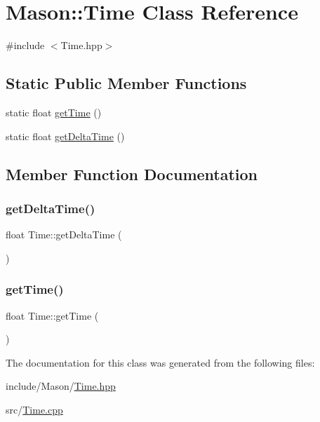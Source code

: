 \hypertarget{class_mason_1_1_time}{}\section{Mason\+:\+:Time Class Reference}
\label{class_mason_1_1_time}


{\ttfamily \#include $<$Time.\+hpp$>$}

\subsection*{Static Public Member Functions}
\begin{DoxyCompactItemize}
\item 
static float \hyperlink{class_mason_1_1_time_ad6773c7a2339b463fc7ea14e31315c89}{get\+Time} ()
\item 
static float \hyperlink{class_mason_1_1_time_a405c7642c4ba0ee719a8d0491099102a}{get\+Delta\+Time} ()
\end{DoxyCompactItemize}


\subsection{Member Function Documentation}
\hypertarget{class_mason_1_1_time_a405c7642c4ba0ee719a8d0491099102a}{}\label{class_mason_1_1_time_a405c7642c4ba0ee719a8d0491099102a} 
\subsubsection{\texorpdfstring{get\+Delta\+Time()}{getDeltaTime()}}
{\footnotesize\ttfamily float Time\+::get\+Delta\+Time (\begin{DoxyParamCaption}{ }\end{DoxyParamCaption})\hspace{0.3cm}{\ttfamily [static]}}

\hypertarget{class_mason_1_1_time_ad6773c7a2339b463fc7ea14e31315c89}{}\label{class_mason_1_1_time_ad6773c7a2339b463fc7ea14e31315c89} 
\subsubsection{\texorpdfstring{get\+Time()}{getTime()}}
{\footnotesize\ttfamily float Time\+::get\+Time (\begin{DoxyParamCaption}{ }\end{DoxyParamCaption})\hspace{0.3cm}{\ttfamily [static]}}



The documentation for this class was generated from the following files\+:\begin{DoxyCompactItemize}
\item 
include/\+Mason/\hyperlink{_time_8hpp}{Time.\+hpp}\item 
src/\hyperlink{_time_8cpp}{Time.\+cpp}\end{DoxyCompactItemize}
